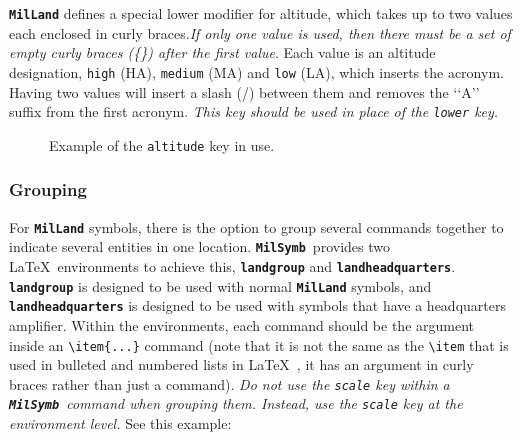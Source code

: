 \documentclass[a4paper, titlepage]{article}
\newcommand\MilSymb{\textbf{\texttt{MilSymb}}}
\begin{document}
\textbf{\texttt{MilLand}} defines a special lower modifier for altitude, which takes up to two values each enclosed in curly braces.\textit{If only one value is used, then there must be a set of empty curly braces (\{\}) after the first value}. Each value is an altitude designation, \texttt{high} (HA), \texttt{medium} (MA) and \texttt{low} (LA), which inserts the acronym. Having two values will insert a slash (/) between them and removes the \lq\lq{}A\rq\rq{} suffix from the first acronym. \textit{This key should be used in place of the \texttt{lower} key.}

\begin{figure}[H]
\centering
{}
\caption{Example of the \texttt{altitude} key in use.}
\end{figure}


\subsubsection{Grouping}

For \textbf{\texttt{MilLand}} symbols, there is the option to group several commands together to indicate several entities in one location. \MilSymb\  provides two \LaTeX\ environments to achieve this,  \textbf{\texttt{landgroup}} and \textbf{\texttt{landheadquarters}}.  \textbf{\texttt{landgroup}} is designed to be used with normal \textbf{\texttt{MilLand}} symbols, and \textbf{\texttt{landheadquarters}} is designed to be used with symbols that have a headquarters amplifier. Within the environments, each command should be the argument inside an \texttt{\textbackslash item\{...\}} command (note that it is not the same as the \texttt{\textbackslash item} that is used in bulleted and numbered lists in \LaTeX\ , it has an argument in curly braces rather than just a command). \textit{Do not use the \texttt{scale} key within a \MilSymb\ command when grouping them. Instead, use the \texttt{scale} key at the environment level.} See this example:\\
\end{document}
